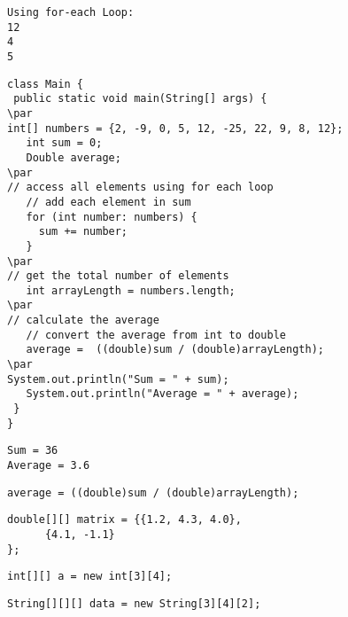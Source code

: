 \documentclass{book}
\def\lthtmlcheckvsize{\ifdim\ht\sizebox<\vsize 
  \ifdim\wd\sizebox<\hsize\expandafter\hfill\fi \expandafter\vfill
  \else\expandafter\vss\fi}%
\begin{document}
{\newpage\clearpage
{}%
\begin{lstlisting}
Using for-each Loop:
12
4
5
\end{lstlisting}%
\lthtmlfigureZ
\lthtmlcheckvsize\clearpage}

{\newpage\clearpage
{}%
\begin{lstlisting}
class Main {
 public static void main(String[] args) {
\par
int[] numbers = {2, -9, 0, 5, 12, -25, 22, 9, 8, 12};
   int sum = 0;
   Double average;
\par
// access all elements using for each loop
   // add each element in sum
   for (int number: numbers) {
     sum += number;
   }
\par
// get the total number of elements
   int arrayLength = numbers.length;
\par
// calculate the average
   // convert the average from int to double
   average =  ((double)sum / (double)arrayLength);
\par
System.out.println("Sum = " + sum);
   System.out.println("Average = " + average);
 }
}
\end{lstlisting}%
\lthtmlfigureZ
\lthtmlcheckvsize\clearpage}

{\newpage\clearpage
{}%
\begin{lstlisting}
Sum = 36
Average = 3.6
\end{lstlisting}%
\lthtmlfigureZ
\lthtmlcheckvsize\clearpage}

{\newpage\clearpage
{}%
\begin{lstlisting}
average = ((double)sum / (double)arrayLength);
\end{lstlisting}%
\lthtmlfigureZ
\lthtmlcheckvsize\clearpage}

{\newpage\clearpage
{}%
\begin{lstlisting}
double[][] matrix = {{1.2, 4.3, 4.0}, 
      {4.1, -1.1}
};
\end{lstlisting}%
\lthtmlfigureZ
\lthtmlcheckvsize\clearpage}

{\newpage\clearpage
{}%
\begin{lstlisting}
int[][] a = new int[3][4];
\end{lstlisting}%
\lthtmlfigureZ
\lthtmlcheckvsize\clearpage}

{\newpage\clearpage
{}%
\begin{lstlisting}
String[][][] data = new String[3][4][2];
\end{lstlisting}%
\lthtmlfigureZ
\lthtmlcheckvsize\clearpage}
\end{document}
